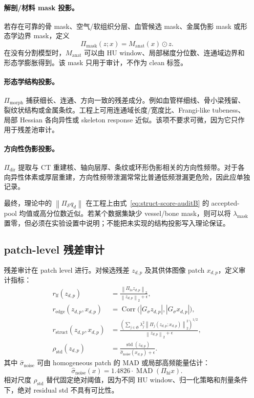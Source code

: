 \documentclass[11pt,a4paper,UTF8,fontset=fandol]{ctexart}
\theoremstyle{definition}
\DeclareMathOperator{\MAD}{MAD}
\newcommand{\norm}[1]{\left\lVert#1\right\rVert}
\begin{document}
\paragraph{解剖/材料 mask 投影。}
若存在可靠的骨 mask、空气/软组织分层、血管候选 mask、金属伪影 mask 或形态学边界 mask，定义
\begin{equation}
    \Pi_{\mathrm{mask}}(z;x)=M_{\mathrm{anat}}(x)\odot z.
\end{equation}
在没有分割模型时，$M_{\mathrm{anat}}$ 可以由 HU window、局部梯度分位数、连通域边界和形态学膨胀得到。该 mask 只用于审计，不作为 clean 标签。

\paragraph{形态学结构投影。}
$\Pi_{\mathrm{morph}}$ 捕获细长、连通、方向一致的残差成分。例如血管样细线、骨小梁残留、裂纹状结构或金属条纹。工程上可用连通域长度/宽度比、Frangi-like tubeness、局部 Hessian 各向异性或 skeleton response 近似。该项不要求可微，因为它只作用于残差池审计。

\paragraph{方向性伪影投影。}
$\Pi_{\mathrm{dir}}$ 提取与 CT 重建核、轴向层厚、条纹或环形伪影相关的方向性频带。对于各向异性体素或厚层重建，方向性频带泄漏常常比普通低频泄漏更危险，因此应单独记录。

最终，理论中的 $\norm{\Pi_{\mathcal S}q_d}$ 在工程上由式~\eqref{eq:struct-score-auditB} 的 accepted-pool 均值或高分位数近似。若某个数据集缺少 vessel/bone mask，则可以将 $\lambda_{\mathrm{mask}}$ 置零，但必须在实验设置中说明；不能把未实现的结构投影写入理论保证。

\subsection{patch-level 残差审计}

残差审计在 patch level 进行。对候选残差 $z_{d,p}$ 及其供体图像 patch $x_{d,p}$，定义审计指标：
\begin{align}
    r_{\mathrm{lf}}(z_{d,p})
    &=\frac{\norm{\Pi_{\mathrm{lo}}z_{d,p}}_2}{\norm{z_{d,p}}_2+\epsilon},\\
    r_{\mathrm{edge}}(z_{d,p},x_{d,p})
    &=\operatorname{Corr}\big(|G_\sigma z_{d,p}|,|G_\sigma x_{d,p}|\big),\\
    r_{\mathrm{struct}}(z_{d,p},x_{d,p})
    &=\frac{\left(\sum_{j\in\mathfrak S}\lambda_j^2\norm{\Pi_j(z_{d,p};x_{d,p})}_2^2\right)^{1/2}}{\norm{z_{d,p}}_2+\epsilon},\\
    \rho_{\mathrm{std}}(z_{d,p})
    &=\frac{\operatorname{std}(z_{d,p})}{\widehat\sigma_{\mathrm{noise}}(x_{d,p})+\epsilon}.
\end{align}
其中 $\widehat\sigma_{\mathrm{noise}}$ 可由 homogeneous patch 的 MAD 或局部高频能量估计：
\begin{equation}
    \widehat\sigma_{\mathrm{noise}}(x)
    =1.4826\cdot \MAD(\Pi_{\mathrm{hi}}x).
\end{equation}
相对尺度 $\rho_{\mathrm{std}}$ 替代固定绝对阈值，因为不同 HU window、归一化策略和剂量条件下，绝对 residual std 不具有可比性。
\end{document}
